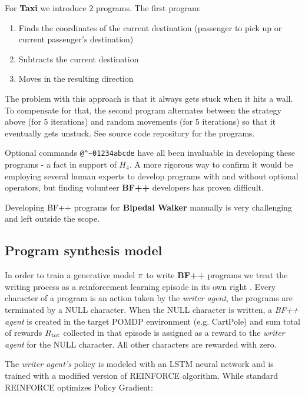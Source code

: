 For \textbf{Taxi} we introduce 2 programs.
The first program:
\begin{enumerate}
    \item Finds the coordinates of the current destination (passenger to pick up or current passenger's destination)
    \item Subtracts the current destination 
    \item Moves in the resulting direction
\end{enumerate}

The problem with this approach is that it always gets stuck when it hits a wall.
To compensate for that, the second program alternates between the strategy above (for 5 iterations) and random movements (for 5 iterations) so that it eventually gets unstuck. See source code repository for the programs.

Optional commands \verb|@^~01234abcde| have all been invaluable in developing these programs - a fact in support of $H_4$.
A more rigorous way to confirm it would be employing several human experts to develop programs with and without optional operators, but finding volunteer \textbf{BF++} developers has proven difficult. 

Developing BF++ programs for \textbf{Bipedal Walker} manually is very challenging and left outside the scope.

\subsection{Program synthesis model}
\label{sec:bfpp-ps-model}

In order to train a generative model $\pi$ to write \textbf{BF++} programs we treat the writing process as a reinforcement learning episode in its own right \cite{abolafiaNeuralProgramSynthesis2018} .
Every character of a program is an action taken by the \emph{writer agent}, the programs are terminated by a NULL character.
When the NULL character is written, a \emph{BF++ agent} is created in the target POMDP environment (e.g. CartPole) and sum total of rewards $R_\text{tot}$ collected in that episode is assigned as a reward to the \emph{writer agent} for the NULL character.
All other characters are rewarded with zero.

The \emph{writer agent's} policy is modeled with an LSTM \cite{hochreiterLongShorttermMemory1997} neural network and is trained with a modified version of REINFORCE \cite{williamsSimpleStatisticalGradientfollowing1992}algorithm.
While standard REINFORCE optimizes Policy Gradient:

